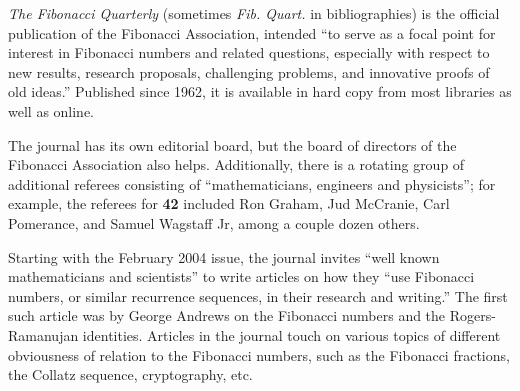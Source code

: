 \documentclass[12pt]{article}
\begin{document}
{\em The Fibonacci Quarterly} (sometimes {\em Fib. Quart.} in bibliographies) is the official publication of the Fibonacci Association, intended ``to serve as a focal point for interest in Fibonacci numbers and related questions, especially with respect to new results, research proposals, challenging problems, and innovative proofs of old ideas.'' Published since 1962, it is available in hard copy from most libraries as well as online.

The journal has its own editorial board, but the board of directors of the Fibonacci Association also helps. Additionally, there is a rotating group of additional referees consisting of ``mathematicians, engineers and physicists''; for example, the referees for {\bf 42} included Ron Graham, Jud McCranie, Carl Pomerance, and Samuel Wagstaff Jr, among a couple dozen others.

Starting with the February 2004 issue, the journal invites ``well known mathematicians and scientists'' to write articles  on how they ``use Fibonacci numbers, or similar recurrence sequences, in their research and writing.'' The first such article was by George Andrews on the Fibonacci numbers and the Rogers-Ramanujan identities. Articles in the journal touch on various topics of different obviousness of relation to the Fibonacci numbers, such as the Fibonacci fractions, the Collatz sequence, cryptography, etc.


\end{document}
